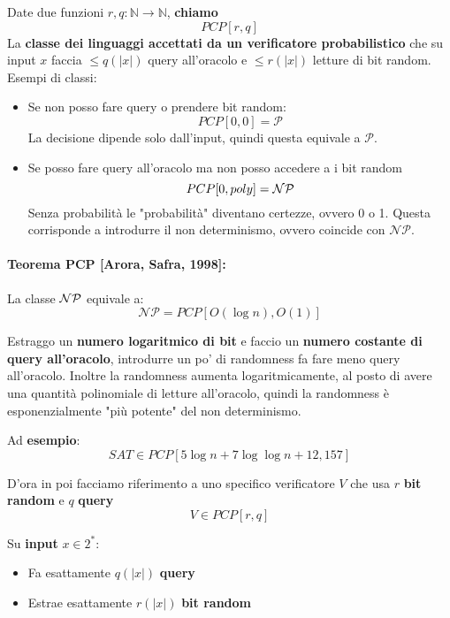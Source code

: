 Date due funzioni $r,q : \mathbb{N} \rightarrow \mathbb{N}$, \textbf{chiamo} 
$$ PCP [r,q] $$
La \textbf{classe dei linguaggi accettati da un verificatore probabilistico} che su input $x$ faccia $\leq q(|x|)$ query all'oracolo e $\leq r(|x|)$ letture di bit random.\\

Esempi di classi: 
\begin{itemize}
	\item Se non posso fare query o prendere bit random:
	$$ PCP [0,0] = \mathcal{P} $$
	La decisione dipende solo dall'input, quindi questa equivale a $\mathcal{P}$.\\
	
	\item Se posso fare query all'oracolo ma non posso accedere a i bit random
	$$ PCP [0, poly] = \mathcal{NP} $$
	Senza probabilità le "probabilità" diventano certezze, ovvero 0 o 1. Questa corrisponde a introdurre il non determinismo, ovvero coincide con $\mathcal{NP}$.\\
\end{itemize}

\paragraph{Teorema PCP [Arora, Safra, 1998]: } La classe $\mathcal{NP}$ equivale a:
$$\mathcal{NP} = PCP [O (\log n), O(1)] $$

Estraggo un \textbf{numero logaritmico di bit} e faccio un \textbf{numero costante di query all'oracolo}, introdurre un po' di randomness fa fare meno query all'oracolo. Inoltre la randomness aumenta logaritmicamente, al posto di avere una quantità polinomiale di letture all'oracolo, quindi la randomness è esponenzialmente "più potente" del non determinismo.\\

\newpage

Ad \textbf{esempio}: 
$$ SAT \in PCP [ 5 \log n + 7 \log \log n + 12, 157] $$

D'ora in poi facciamo riferimento a uno specifico verificatore $V$ che usa $r$ \textbf{bit random} e $q$ \textbf{query}
$$ V \in PCP [r,q] $$

Su \textbf{input} $x \in 2^\ast$:
\begin{itemize}
	\item Fa esattamente $q(|x|)$ \textbf{query}
	\item Estrae esattamente $r(|x|)$ \textbf{bit random}
\end{itemize}

